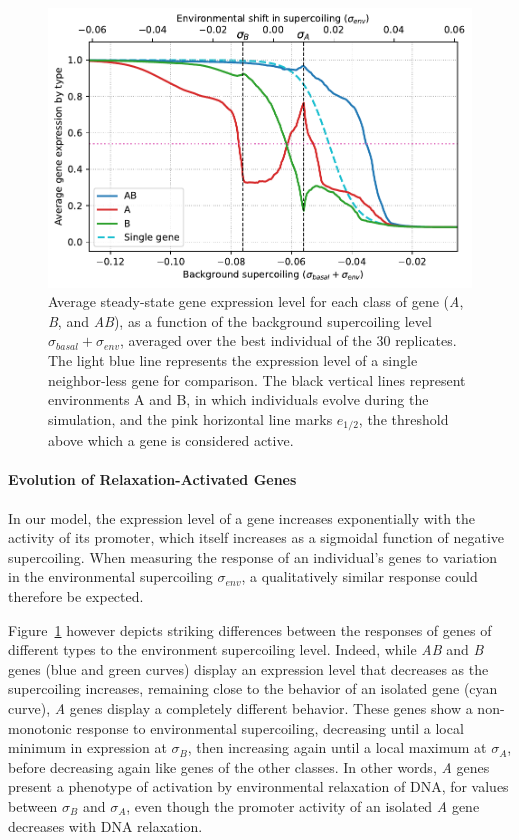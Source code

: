 \begin{figure}[H]
  \centering
  \includegraphics[width=\textwidth]{ploscb/img/activity_sigmas_avg.pdf}
  \caption{Average steady-state gene expression level for each class of gene (\emph{A}, \emph{B}, and \emph{AB}), as a function of the background supercoiling level $\sigma_{basal} + \sigma_{env}$, averaged over the best individual of the 30 replicates.
  The light blue line represents the expression level of a single neighbor-less gene for comparison.
  The black vertical lines represent environments A and B, in which individuals evolve during the simulation, and the pink horizontal line marks $e_{1/2}$, the threshold above which a gene is considered active.}
  \label{fig:activity_by_sigma}
\end{figure}

\paragraph{Evolution of Relaxation-Activated Genes}
In our model, the expression level of a gene increases exponentially with the activity of its promoter, which itself increases as a sigmoidal function of negative supercoiling.
When measuring the response of an individual's genes to variation in the environmental supercoiling $\sigma_{env}$, a qualitatively similar response could therefore be expected.

Figure~\ref{fig:activity_by_sigma} however depicts striking differences between the responses of genes of different types to the environment supercoiling level.
Indeed, while \emph{AB} and \emph{B} genes (blue and green curves) display an expression level that decreases as the supercoiling increases, remaining close to the behavior of an isolated gene (cyan curve), \emph{A} genes display a completely different behavior.
These genes show a non-monotonic response to environmental supercoiling, decreasing until a local minimum in expression at $\sigma_B$, then increasing again until a local maximum at $\sigma_A$, before decreasing again like genes of the other classes.
In other words, \emph{A} genes present a phenotype of activation by environmental relaxation of DNA, for values between $\sigma_B$ and $\sigma_A$, even though the promoter activity of an isolated \emph{A} gene decreases with DNA relaxation.

